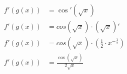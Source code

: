 \documentclass[preview]{standalone}
\begin{document}
\begin{align*}
f'(g(x))&= \cos'(\sqrt{x}) \\ f'(g(x))&=cos(\sqrt{x}) \cdot (\sqrt{x})' \\ f'(g(x))&=cos(\sqrt{x}) \cdot (\frac{1}{2} \cdot x^{-\frac{1}{2}}) \\ f'(g(x))&=\frac{\cos(\sqrt{x})}{2\sqrt{x}}
\end{align*}
\end{document}
